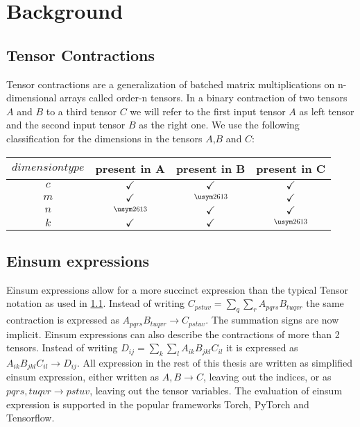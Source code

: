 \section{Background}

\subsection{Tensor Contractions}
\label{sec:tensorContractions}

Tensor contractions are a generalization of batched matrix multiplications on n-dimensional arrays called order-n tensors.
In a binary contraction of two tensors $A$ and $B$ to a third tensor $C$ we will refer to the first input tensor $A$ as left tensor and the second input tensor $B$ as the right one. %
We use the following classification for the dimensions in the tensors $A$,$B$ and $C$:

\begin{tabular}{ |c|c|c|c| } 
  \hline
  $dimension type$ & present in A & present in B & present in C\\
  \hline
  $c$ & $\checkmark$& $\checkmark$& $\checkmark$\\
  $m$ & $\checkmark$& $\crossmark$& $\checkmark$\\
  $n$ & $\crossmark$& $\checkmark$& $\checkmark$\\
  $k$ & $\checkmark$& $\checkmark$& $\crossmark$\\
  \hline
 \end{tabular}



\subsection{Einsum expressions}

Einsum expressions allow for a more succinct expression than the typical Tensor notation as used in \ref{sec:tensorContractions}.
Instead of writing $C_{pstuv}=\sum_{q}\sum_{r}A_{pqrs}B_{tuqvr}$ the same contraction is expressed as $A_{pqrs}B_{tuqvr} \rightarrow C_{pstuv}$.
The summation signs are now implicit.
Einsum expressions can also describe the contractions of more than 2 tensors\cite{einsum_is_all_you_need}.
Instead of writing $D_{ij} = \sum_{k}\sum_{l}A_{ik}B_{jkl}C_{il}$ it is expressed as $A_{ik}B_{jkl}C_{il} \rightarrow D_{ij}$.
All expression in the rest of this thesis are written as simplified einsum expression, either written as $A,B\rightarrow C$, leaving out the indices, or as $pqrs,tuqvr \rightarrow pstuv$, leaving out the tensor variables.
The evaluation of einsum expression is supported in the popular frameworks Torch\cite{torch}, PyTorch\cite{pytorch} and Tensorflow\cite{tensorflow}.

